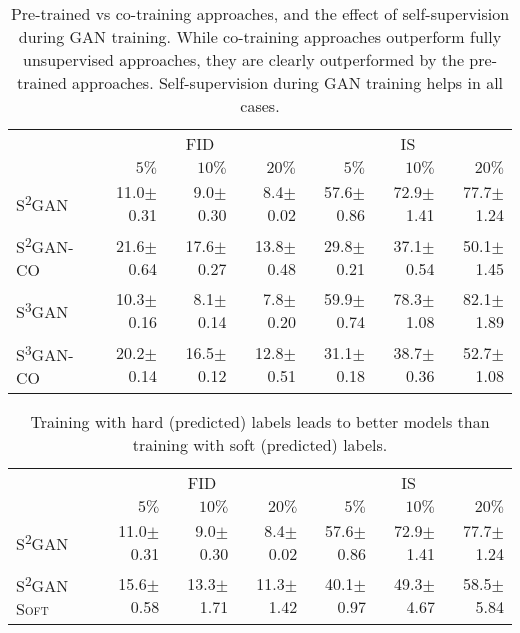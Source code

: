 \documentclass{article}
\newcommand{\cotrainSS}{\textsc{S\textsuperscript{2}GAN-CO}}
\newcommand{\cotrainSSS}{\textsc{S\textsuperscript{3}GAN-CO}}
\newcommand{\tranSS}{\textsc{S\textsuperscript{2}GAN}}
\newcommand{\tranSSS}{\textsc{S\textsuperscript{3}GAN}}
\begin{document}
\begin{table}[h!]
\centering
\caption{Pre-trained vs co-training approaches, and the effect of self-supervision during GAN training. While co-training approaches outperform fully unsupervised approaches, they are clearly outperformed by the pre-trained approaches. Self-supervision during GAN training helps in all cases.\vspace{0.2cm}}
\label{tab:transfer_vs_direct_mean_std}
\setlength\tabcolsep{4.5pt}
\begin{tabular}{lrrrrrr}
\toprule
&\multicolumn{3}{c}{\textsc{FID}} & \multicolumn{3}{c}{\textsc{IS}}\\\cmidrule(lr){2-4}\cmidrule(lr){5-7}
&       $5\%$  &  $10\%$ &   $20\%$ &  $5\%$  &  $10\%$ &   $20\%$ \\\midrule
\tranSS{}           &  11.0$\pm$0.31 &   9.0$\pm$0.30 &   8.4$\pm$0.02 &  57.6$\pm$0.86 &  72.9$\pm$1.41 &  77.7$\pm$1.24 \\
\cotrainSS{}  &  21.6$\pm$0.64 &  17.6$\pm$0.27 &  13.8$\pm$0.48 &  29.8$\pm$0.21 &  37.1$\pm$0.54 &  50.1$\pm$1.45 \\
\tranSSS{}           &  10.3$\pm$0.16 &   8.1$\pm$0.14 &   7.8$\pm$0.20 &  59.9$\pm$0.74 &  78.3$\pm$1.08 &  82.1$\pm$1.89 \\
\cotrainSSS{}  &  20.2$\pm$0.14 &  16.5$\pm$0.12 &  12.8$\pm$0.51 &  31.1$\pm$0.18 &  38.7$\pm$0.36 &  52.7$\pm$1.08 \\
\bottomrule
\end{tabular} \end{table}

\begin{table}[h!]
\centering
\caption{Training with hard (predicted) labels leads to better models than training with soft (predicted) labels.\vspace{0.2cm}}
\setlength\tabcolsep{4.5pt}
\begin{tabular}{lrrrrrr}
\toprule
&\multicolumn{3}{c}{\textsc{FID}} & \multicolumn{3}{c}{\textsc{IS}}\\\cmidrule(lr){2-4}\cmidrule(lr){5-7}
&       $5\%$  &  $10\%$ &   $20\%$ &  $5\%$  &  $10\%$ &   $20\%$ \\
\midrule
\tranSS{}       &  11.0$\pm$0.31 &   9.0$\pm$0.30 &   8.4$\pm$0.02 &  57.6$\pm$0.86 &  72.9$\pm$1.41 &  77.7$\pm$1.24 \\
\tranSS{} \textsc{Soft}  &  15.6$\pm$0.58 &  13.3$\pm$1.71 &  11.3$\pm$1.42 &  40.1$\pm$0.97 &  49.3$\pm$4.67 &  58.5$\pm$5.84 \\
\bottomrule
\end{tabular} \label{tab:soft_vs_hard_mean_std}
\end{table}
\end{document}
